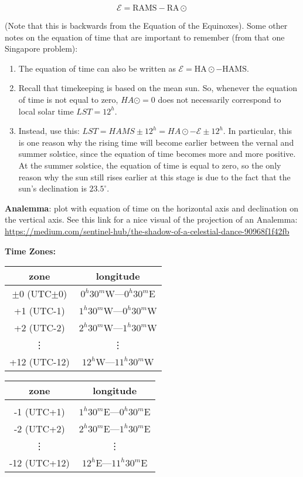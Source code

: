 \documentclass[11pt]{article}
\newcommand{\V}{

\vspace{\baselineskip}

}
\begin{document}
\[\mathcal{E} = \text{RAMS} - \text{RA}\odot\]

(Note that this is backwards from the Equation of the Equinoxes). Some other notes on the equation of time that are important to remember (from that one Singapore problem): 
\begin{enumerate}
    \item The equation of time can also be written as $\mathcal{E} = \text{HA}\odot - \text{HAMS}$. 
    \item Recall that timekeeping is based on the mean sun. So, whenever the equation of time is not equal to zero, $HA\odot = 0$ does not necessarily correspond to local solar time $LST = 12^{h}$.
    \item Instead, use this: $LST = HAMS \pm 12^{h} = HA\odot - \mathcal{E} \pm 12^{h}$. In particular, this is one reason why the rising time will become earlier between the vernal and summer solstice, since the equation of time becomes more and more positive. At the summer solstice, the equation of time is equal to zero, so the only reason why the sun still rises earlier at this stage is due to the fact that the sun's declination is $23.5^{\circ}$.
\end{enumerate}


\V




\textbf{Analemma}: plot with equation of time on the horizontal axis and declination on the vertical axis. See this link for a nice visual of the projection of an Analemma: \href{https://medium.com/sentinel-hub/the-shadow-of-a-celestial-dance-90968f1f42fb}{https://medium.com/sentinel-hub/the-shadow-of-a-celestial-dance-90968f1f42fb}\V

\textbf{Time Zones:} 

\begin{center}
\begin{tabular}{|c|c|}
\hline
zone & longitude \\
\hline\hline
$\pm 0$ (UTC$\pm$0) & $0^{h}30^{m}\text{W}$—$0^{h}30^{m}\text{E}$  \\
\hline
+1 (UTC-1) & $1^{h}30^{m}\text{W}$—$0^{h}30^{m}\text{W}$  \\
\hline
+2 (UTC-2) & $2^{h}30^{m}\text{W}$—$1^{h}30^{m}\text{W}$  \\
\hline
   \vdots  &\vdots  \\
\hline
+12 (UTC-12) & $12^{h}\text{W}$—$11^{h}30^{m}\text{W}$  \\
\hline
\end{tabular}
\begin{tabular}{|c|c|}
\hline
zone & longitude \\
\hline\hline
&  \\
\hline
-1 (UTC+1) & $1^{h}30^{m}\text{E}$—$0^{h}30^{m}\text{E}$  \\
\hline
-2 (UTC+2) & $2^{h}30^{m}\text{E}$—$1^{h}30^{m}\text{E}$  \\
\hline
   \vdots  &\vdots  \\
\hline
-12 (UTC+12) & $12^{h}\text{E}$—$11^{h}30^{m}\text{E}$  \\
\hline
\end{tabular}
\end{center}
\end{document}
